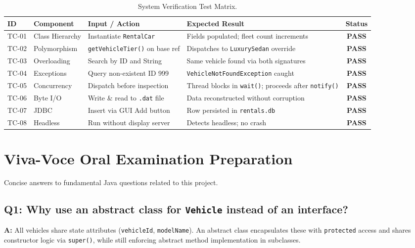 \documentclass[11pt,a4paper]{article}
\begin{document}
\begin{table}[h!]
\centering
\small
\begin{tabularx}{\textwidth}{l p{2.5cm} p{3.5cm} p{4.0cm} c}
\toprule
\textbf{ID} & \textbf{Component} & \textbf{Input / Action} & \textbf{Expected Result} & \textbf{Status} \\
\midrule
TC-01 & Class Hierarchy & Instantiate \texttt{RentalCar} & Fields populated; fleet count increments & \textbf{PASS} \\
\addlinespace
TC-02 & Polymorphism & \texttt{getVehicleTier()} on base ref & Dispatches to \texttt{LuxurySedan} override & \textbf{PASS} \\
\addlinespace
TC-03 & Overloading & Search by ID and String & Same vehicle found via both signatures & \textbf{PASS} \\
\addlinespace
TC-04 & Exceptions & Query non-existent ID 999 & \texttt{VehicleNotFoundException} caught & \textbf{PASS} \\
\addlinespace
TC-05 & Concurrency & Dispatch before inspection & Thread blocks in \texttt{wait()}; proceeds after \texttt{notify()} & \textbf{PASS} \\
\addlinespace
TC-06 & Byte I/O & Write \& read to \texttt{.dat} file & Data reconstructed without corruption & \textbf{PASS} \\
\addlinespace
TC-07 & JDBC & Insert via GUI Add button & Row persisted in \texttt{rentals.db} & \textbf{PASS} \\
\addlinespace
TC-08 & Headless & Run without display server & Detects headless; no crash & \textbf{PASS} \\
\bottomrule
\end{tabularx}
\caption{System Verification Test Matrix.}
\label{tab:verification_matrix}
\end{table}

\newpage
\section{Viva-Voce Oral Examination Preparation}
\label{sec:viva}

Concise answers to fundamental Java questions related to this project.

\subsection*{Q1: Why use an abstract class for \texttt{Vehicle} instead of an interface?}
\textbf{A:} All vehicles share state attributes (\texttt{vehicleId}, \texttt{modelName}). An abstract class encapsulates these with \texttt{protected} access and shares constructor logic via \texttt{super()}, while still enforcing abstract method implementation in subclasses.
\end{document}

